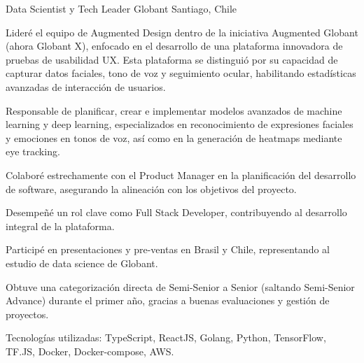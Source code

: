 \begin{cventries}

  \cventry
    {Data Scientist y Tech Leader} %
    {Globant} %
    {Santiago, Chile} %
    {} %
    {
      \begin{cvitems} %
        \item {Lideré el equipo de Augmented Design dentro de la iniciativa Augmented Globant (ahora Globant X), enfocado en el desarrollo de una plataforma innovadora de pruebas de usabilidad UX. Esta plataforma se distinguió por su capacidad de capturar datos faciales, tono de voz y seguimiento ocular, habilitando estadísticas avanzadas de interacción de usuarios.}
        \item {Responsable de planificar, crear e implementar modelos avanzados de machine learning y deep learning, especializados en reconocimiento de expresiones faciales y emociones en tonos de voz, así como en la generación de heatmaps mediante eye tracking.}
        \item {Colaboré estrechamente con el Product Manager en la planificación del desarrollo de software, asegurando la alineación con los objetivos del proyecto.}
        \item {Desempeñé un rol clave como Full Stack Developer, contribuyendo al desarrollo integral de la plataforma.}
        \item {Participé en presentaciones y pre-ventas en Brasil y Chile, representando al estudio de data science de Globant.}
        \item {Obtuve una categorización directa de Semi-Senior a Senior (saltando Semi-Senior Advance) durante el primer año, gracias a buenas evaluaciones y gestión de proyectos.}
        \item {Tecnologías utilizadas: TypeScript, ReactJS, Golang, Python, TensorFlow, TF.JS, Docker, Docker-compose, AWS.}
      \end{cvitems}
    }


\end{cventries}
